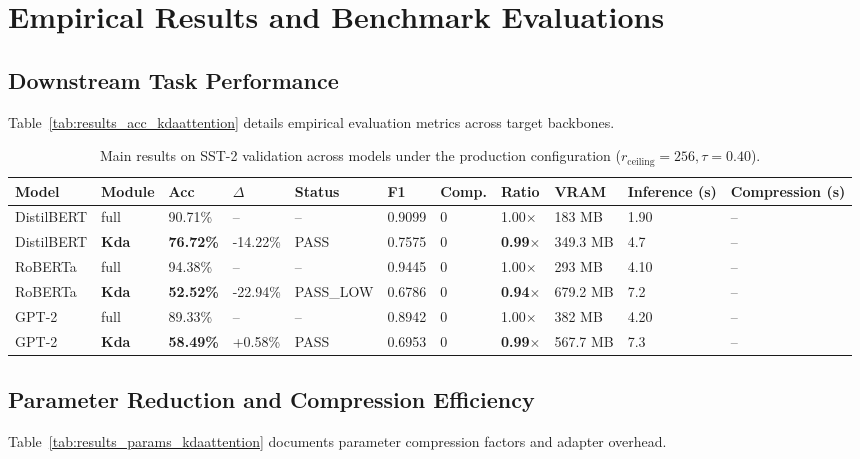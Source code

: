 \section{Empirical Results and Benchmark Evaluations}

\subsection{Downstream Task Performance}
Table~\ref{tab:results_acc_kdaattention} details empirical evaluation metrics across target backbones.

\begin{table}[t]
\centering
\small
\begin{tabular}{lllllllllll}
\toprule
\textbf{Model} & \textbf{Module} & \textbf{Acc} & \textbf{$\Delta$} & \textbf{Status} & \textbf{F1} & \textbf{Comp.} & \textbf{Ratio} & \textbf{VRAM} & \textbf{Inference (s)} & \textbf{Compression (s)} \\
\midrule
DistilBERT & full & 90.71\% & -- & -- & 0.9099 & 0 & 1.00$\times$ & 183 MB & 1.90 & -- \\
DistilBERT & \textbf{Kda} & \textbf{76.72\%} & -14.22\% & PASS & 0.7575 & 0 & \textbf{0.99$\times$} & 349.3 MB & 4.7 & -- \\
RoBERTa & full & 94.38\% & -- & -- & 0.9445 & 0 & 1.00$\times$ & 293 MB & 4.10 & -- \\
RoBERTa & \textbf{Kda} & \textbf{52.52\%} & -22.94\% & PASS_LOW & 0.6786 & 0 & \textbf{0.94$\times$} & 679.2 MB & 7.2 & -- \\
GPT-2 & full & 89.33\% & -- & -- & 0.8942 & 0 & 1.00$\times$ & 382 MB & 4.20 & -- \\
GPT-2 & \textbf{Kda} & \textbf{58.49\%} & +0.58\% & PASS & 0.6953 & 0 & \textbf{0.99$\times$} & 567.7 MB & 7.3 & -- \\
\bottomrule
\end{tabular}
\caption{Main results on SST-2 validation across models under the production configuration ($r_{\mathrm{ceiling}}=256, \tau=0.40$).}
\label{tab:main_sst2}
\end{table}

\subsection{Parameter Reduction and Compression Efficiency}
Table~\ref{tab:results_params_kdaattention} documents parameter compression factors and adapter overhead.

